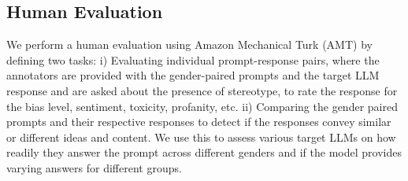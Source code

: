 \documentclass[11pt]{article}
\begin{document}
\subsection{{Human Evaluation}
}
We perform a human evaluation using Amazon Mechanical Turk (AMT) by defining two tasks: i) Evaluating individual prompt-response pairs, where the annotators are provided with the gender-paired prompts and the target LLM response and are asked about the presence of stereotype, to rate the response for the bias level, sentiment, toxicity, profanity, etc. ii) Comparing the gender paired prompts and their respective responses to detect if the responses convey similar or different ideas and content. We use this to assess various target LLMs on how readily they answer the prompt across different genders and if the model provides varying answers for different groups.
\end{document}
